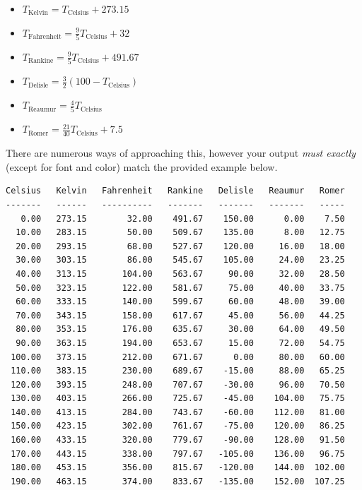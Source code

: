 \documentclass{article}
\begin{document}
\begin{itemize}
	\item{$T_\text{Kelvin} = T_\text{Celsius} + 273.15$}
	\item{$T_\text{Fahrenheit} = \frac{9}{5} T_\text{Celsius} + 32$}
	\item{$T_\text{Rankine} = \frac{9}{5} T_\text{Celsius} + 491.67$}
	\item{$T_\text{Delisle} = \frac{3}{2}(100 - T_\text{Celsius})$}
	\item{$T_\text{Reaumur} = \frac{4}{5}T_\text{Celsius} $}
	\item{$T_\text{Romer} = \frac{21}{40} T_\text{Celsius} + 7.5$}
\end{itemize}

There are numerous ways of approaching this, however your output
\emph{must exactly} (except for font and color) match the provided
example below.

\begin{lstlisting}
Celsius   Kelvin   Fahrenheit   Rankine   Delisle   Reaumur   Romer
-------   ------   ----------   -------   -------   -------   -----
   0.00   273.15        32.00    491.67    150.00      0.00    7.50
  10.00   283.15        50.00    509.67    135.00      8.00   12.75
  20.00   293.15        68.00    527.67    120.00     16.00   18.00
  30.00   303.15        86.00    545.67    105.00     24.00   23.25
  40.00   313.15       104.00    563.67     90.00     32.00   28.50
  50.00   323.15       122.00    581.67     75.00     40.00   33.75
  60.00   333.15       140.00    599.67     60.00     48.00   39.00
  70.00   343.15       158.00    617.67     45.00     56.00   44.25
  80.00   353.15       176.00    635.67     30.00     64.00   49.50
  90.00   363.15       194.00    653.67     15.00     72.00   54.75
 100.00   373.15       212.00    671.67      0.00     80.00   60.00
 110.00   383.15       230.00    689.67    -15.00     88.00   65.25
 120.00   393.15       248.00    707.67    -30.00     96.00   70.50
 130.00   403.15       266.00    725.67    -45.00    104.00   75.75
 140.00   413.15       284.00    743.67    -60.00    112.00   81.00
 150.00   423.15       302.00    761.67    -75.00    120.00   86.25
 160.00   433.15       320.00    779.67    -90.00    128.00   91.50
 170.00   443.15       338.00    797.67   -105.00    136.00   96.75
 180.00   453.15       356.00    815.67   -120.00    144.00  102.00
 190.00   463.15       374.00    833.67   -135.00    152.00  107.25
\end{lstlisting}
\end{document}
